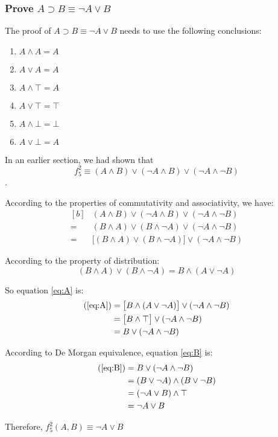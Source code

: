 \documentclass[12pt, letterpaper]{article}
\begin{document}
\subsubsection{Prove $A \supset B \equiv \lnot A \lor B$}

The proof of $A \supset B \equiv \lnot A \lor B$ needs to use the following
conclusions:
\begin{enumerate}
  \item $A \land A = A$
  \item $A \lor A = A$
  \item $A \land \top = A$
  \item $A \lor \top = \top$
  \item $A \land \bot = \bot$
  \item $A \lor \bot = A$
\end{enumerate}

In an earlier section, we had shown that \[ f_5^2 \equiv (A \land B) \lor
(\lnot A \land B) \lor (\lnot A \land \lnot B) \].

According to the properties of commutativity and associativity, we have:
\begin{equation}\label{eq:A}
  \begin{aligned}[b]
    & (A \land B) \lor (\lnot A \land B) \lor (\lnot A \land \lnot B) \\
    = & (B \land A) \lor (B \land \lnot A) \lor (\lnot A \land \lnot B) \\
    = & \bigl[(B \land A) \lor (B \land \lnot A)\bigr] \lor (\lnot A \land \lnot B)
  \end{aligned}
\end{equation}

According to the property of distribution:
\[(B \land A) \lor (B \land \lnot A) = B \land (A \lor \lnot A)\]

So equation \ref{eq:A} is:
\begin{equation}\label{eq:B}
  \begin{aligned}[b]
    (\ref{eq:A})
    & = \bigl[B \land (A \lor \lnot A)\bigr] \lor (\lnot A \land \lnot B) \\
    & = \bigl[B \land \top\bigr] \lor (\lnot A \land \lnot B) \\
    & = B \lor (\lnot A \land \lnot B)
  \end{aligned}
\end{equation}

According to De Morgan equivalence, equation \ref{eq:B} is:
\begin{equation}\label{eq:C}
  \begin{aligned}[b]
    (\ref{eq:B})
    & = B \lor (\lnot A \land \lnot B) \\
    & = (B \lor \lnot A) \land (B \lor \lnot B) \\
    & = (\lnot A \lor B) \land \top \\
    & = \lnot A \lor B
  \end{aligned}
\end{equation}

Therefore, $f_5^2(A, B) \equiv \lnot A \lor B$
\end{document}

